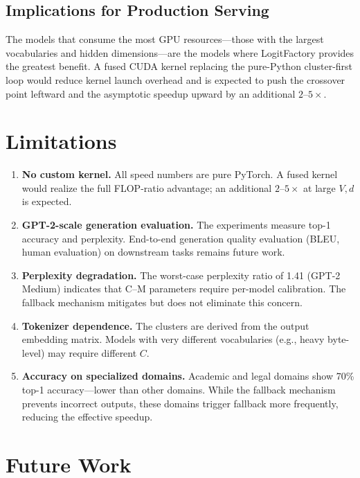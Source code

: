 \documentclass[11pt]{article}
\begin{document}
\subsection{Implications for Production Serving}

The models that consume the most GPU resources---those with the largest vocabularies and hidden dimensions---are the models where LogitFactory provides the greatest benefit. A fused CUDA kernel replacing the pure-Python cluster-first loop would reduce kernel launch overhead and is expected to push the crossover point leftward and the asymptotic speedup upward by an additional $2$--$5\times$.

\section{Limitations}

\begin{enumerate}
    \item \textbf{No custom kernel.} All speed numbers are pure PyTorch. A fused kernel would realize the full FLOP-ratio advantage; an additional $2$--$5\times$ at large $V, d$ is expected.
    \item \textbf{GPT-2-scale generation evaluation.} The experiments measure top-1 accuracy and perplexity. End-to-end generation quality evaluation (BLEU, human evaluation) on downstream tasks remains future work.
    \item \textbf{Perplexity degradation.} The worst-case perplexity ratio of 1.41 (GPT-2 Medium) indicates that C--M parameters require per-model calibration. The fallback mechanism mitigates but does not eliminate this concern.
    \item \textbf{Tokenizer dependence.} The clusters are derived from the output embedding matrix. Models with very different vocabularies (e.g., heavy byte-level) may require different $C$.
    \item \textbf{Accuracy on specialized domains.} Academic and legal domains show 70\% top-1 accuracy---lower than other domains. While the fallback mechanism prevents incorrect outputs, these domains trigger fallback more frequently, reducing the effective speedup.
\end{enumerate}

\section{Future Work}
\end{document}
